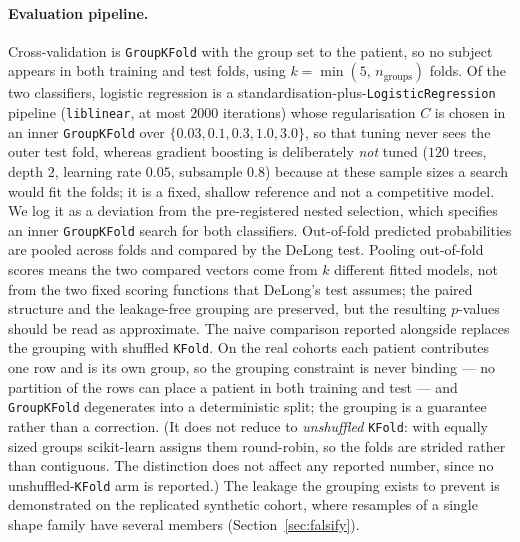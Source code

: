 \documentclass[11pt]{article}
\theoremstyle{definition}
\newcommand{\code}[1]{\texttt{#1}}
\begin{document}
\paragraph{Evaluation pipeline.} Cross-validation is \code{GroupKFold} with the
group set to the patient, so no subject appears in both training and test folds,
using $k=\min(5,\,n_{\mathrm{groups}})$ folds. Of the two classifiers, logistic
regression is a standardisation-plus-\code{LogisticRegression} pipeline
(\code{liblinear}, at most $2000$ iterations) whose regularisation $C$ is chosen
in an inner \code{GroupKFold} over $\{0.03,0.1,0.3,1.0,3.0\}$, so that tuning
never sees the outer test fold, whereas gradient boosting is deliberately
\emph{not} tuned ($120$ trees, depth $2$, learning rate $0.05$, subsample $0.8$)
because at these sample sizes a search would fit the folds; it is a fixed,
shallow reference and not a competitive model. We log it as a deviation from
the pre-registered nested selection, which specifies an inner \code{GroupKFold}
search for both classifiers. Out-of-fold predicted probabilities
are pooled across folds and compared by the DeLong test. Pooling out-of-fold
scores means the two compared vectors come from $k$ different fitted models,
not from the two fixed scoring functions that DeLong's test assumes; the
paired structure and the leakage-free grouping are preserved, but the resulting
$p$-values should be read as approximate. The naive comparison reported alongside
replaces the grouping with shuffled \code{KFold}. On the real cohorts each
patient contributes one row and is its own group, so the grouping constraint is
never binding --- no partition of the rows can place a patient in both training
and test --- and \code{GroupKFold} degenerates into a deterministic split; the
grouping is a guarantee rather than a correction. (It does not reduce to
\emph{unshuffled} \code{KFold}: with equally sized groups scikit-learn
assigns them round-robin, so the folds are strided rather than contiguous. The
distinction does not affect any reported number, since no unshuffled-\code{KFold}
arm is reported.) The leakage the grouping exists to prevent is demonstrated on
the replicated synthetic cohort, where resamples of a single shape family have
several members (Section~\ref{sec:falsify}).
\end{document}
